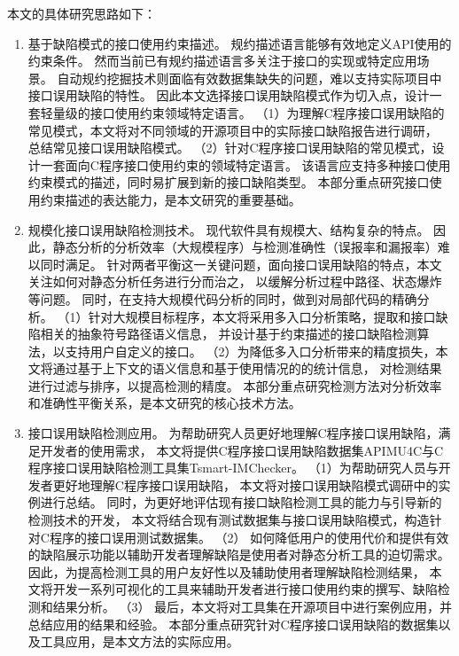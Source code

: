 本文的具体研究思路如下：
\begin{enumerate}
	\item {\kaishu 基于缺陷模式的接口使用约束描述。}
	规约描述语言能够有效地定义API使用的约束条件。
	然而当前已有规约描述语言多关注于接口的实现或特定应用场景。
	自动规约挖掘技术则面临有效数据集缺失的问题，难以支持实际项目中接口误用缺陷的特性。
	因此本文选择接口误用缺陷模式作为切入点，设计一套轻量级的接口使用约束领域特定语言。
	（1）为理解C程序接口误用缺陷的常见模式，本文将对不同领域的开源项目中的实际接口缺陷报告进行调研，
	总结常见接口误用缺陷模式。
	（2）针对C程序接口误用缺陷的常见模式，设计一套面向C程序接口使用约束的领域特定语言。
	该语言应支持多种接口使用约束模式的描述，同时易扩展到新的接口缺陷类型。
	本部分重点研究接口使用约束描述的表达能力，是本文研究的重要基础。
	
	\item {\kaishu 规模化接口误用缺陷检测技术。}
	现代软件具有规模大、结构复杂的特点。
	因此，静态分析的分析效率（大规模程序）与检测准确性（误报率和漏报率）难以同时满足。
	针对两者平衡这一关键问题，面向接口误用缺陷的特点，本文关注如何对静态分析任务进行分而治之，
	以缓解分析过程中路径、状态爆炸等问题。
	同时，在支持大规模代码分析的同时，做到对局部代码的精确分析。
	（1）针对大规模目标程序，本文将采用多入口分析策略，提取和接口缺陷相关的抽象符号路径语义信息，
	并设计基于约束描述的接口缺陷检测算法，以支持用户自定义的接口。
	（2）为降低多入口分析带来的精度损失，本文将通过基于上下文的语义信息和基于使用情况的的统计信息，
	对检测结果进行过滤与排序，以提高检测的精度。
	本部分重点研究检测方法对分析效率和准确性平衡关系，是本文研究的核心技术方法。
	
	\item {\kaishu 接口误用缺陷检测应用。}
	为帮助研究人员更好地理解C程序接口误用缺陷，满足开发者的使用需求，
	本文将提供C程序接口误用缺陷数据集APIMU4C与C程序接口误用缺陷检测工具集Tsmart-IMChecker。
	（1）为帮助研究人员与开发者更好地理解C程序接口误用缺陷，
	本文将对接口误用缺陷模式调研中的实例进行总结。
	同时，为更好地评估现有接口缺陷检测工具的能力与引导新的检测技术的开发，
	本文将结合现有测试数据集与接口误用缺陷模式，构造针对C程序的接口误用测试数据集。
	（2）
	如何降低用户的使用代价和提供有效的缺陷展示功能以辅助开发者理解缺陷是使用者对静态分析工具的迫切需求。
	因此，为提高检测工具的用户友好性以及辅助使用者理解缺陷检测结果，
	本文将开发一系列可视化的工具来辅助开发者进行接口使用约束的撰写、缺陷检测和结果分析。
	（3）
	最后，本文将对工具集在开源项目中进行案例应用，并总结应用的结果和经验。
	本部分重点研究针对C程序接口误用缺陷的数据集以及工具应用，是本文方法的实际应用。
\end{enumerate}




